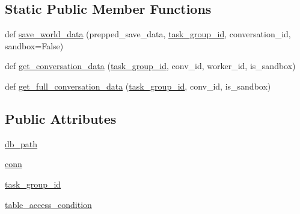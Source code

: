 \subsection*{Static Public Member Functions}
\begin{DoxyCompactItemize}
\item 
def \hyperlink{classparlai_1_1mturk_1_1core_1_1mturk__data__handler_1_1MTurkDataHandler_a500ef3c8e0c9b94d7759436da43a1a62}{save\+\_\+world\+\_\+data} (prepped\+\_\+save\+\_\+data, \hyperlink{classparlai_1_1mturk_1_1core_1_1mturk__data__handler_1_1MTurkDataHandler_abef46871b0b4686b67f0b4dcea99e81c}{task\+\_\+group\+\_\+id}, conversation\+\_\+id, sandbox=False)
\item 
def \hyperlink{classparlai_1_1mturk_1_1core_1_1mturk__data__handler_1_1MTurkDataHandler_a0a245b58629056030d5eedfce5c5a985}{get\+\_\+conversation\+\_\+data} (\hyperlink{classparlai_1_1mturk_1_1core_1_1mturk__data__handler_1_1MTurkDataHandler_abef46871b0b4686b67f0b4dcea99e81c}{task\+\_\+group\+\_\+id}, conv\+\_\+id, worker\+\_\+id, is\+\_\+sandbox)
\item 
def \hyperlink{classparlai_1_1mturk_1_1core_1_1mturk__data__handler_1_1MTurkDataHandler_aac3142a54b238e4d6b976ce657b5f7ac}{get\+\_\+full\+\_\+conversation\+\_\+data} (\hyperlink{classparlai_1_1mturk_1_1core_1_1mturk__data__handler_1_1MTurkDataHandler_abef46871b0b4686b67f0b4dcea99e81c}{task\+\_\+group\+\_\+id}, conv\+\_\+id, is\+\_\+sandbox)
\end{DoxyCompactItemize}
\subsection*{Public Attributes}
\begin{DoxyCompactItemize}
\item 
\hyperlink{classparlai_1_1mturk_1_1core_1_1mturk__data__handler_1_1MTurkDataHandler_a170caaec5ed4c3f3e846475ec953a61a}{db\+\_\+path}
\item 
\hyperlink{classparlai_1_1mturk_1_1core_1_1mturk__data__handler_1_1MTurkDataHandler_a89c3eceb3cbc9177a84e809bcf70cc0f}{conn}
\item 
\hyperlink{classparlai_1_1mturk_1_1core_1_1mturk__data__handler_1_1MTurkDataHandler_abef46871b0b4686b67f0b4dcea99e81c}{task\+\_\+group\+\_\+id}
\item 
\hyperlink{classparlai_1_1mturk_1_1core_1_1mturk__data__handler_1_1MTurkDataHandler_a87c7b504a65f8d87d236e0d31efbdc0d}{table\+\_\+access\+\_\+condition}
\end{DoxyCompactItemize}


